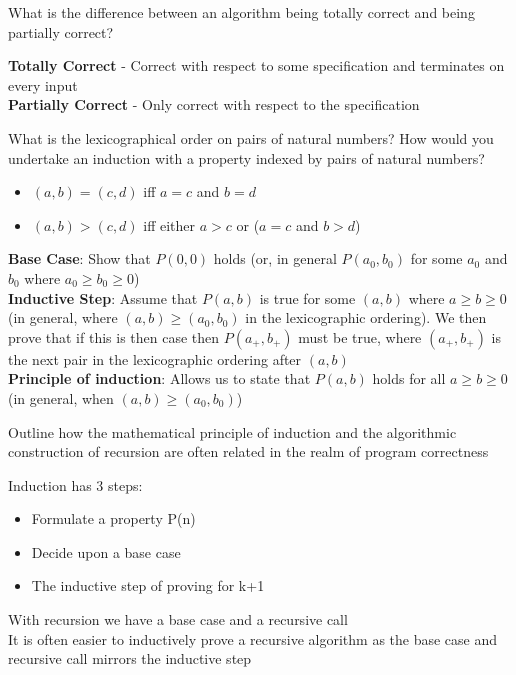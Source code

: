 \documentclass[addpoints]{exam}
\begin{document}
\begin{questions}
\question[2]What is the difference between an algorithm being totally correct and being partially correct?
\begin{solution}[2in]
\textbf{Totally Correct} - Correct with respect to some specification and terminates on every input\\
\textbf{Partially Correct} - Only correct with respect to the specification 
\end{solution}

\question[4]What is the lexicographical order on pairs of natural numbers? How would you undertake an induction with a property indexed by pairs of natural numbers?
\begin{solution}[2in]
\begin{itemize}
	\item $(a,b)=(c,d)$ iff $a=c$ and $b=d$
	\item $(a,b)>(c,d)$ iff either $a>c$ or ($a=c$ and $b>d$)
\end{itemize}
\textbf{Base Case}: Show that $P(0,0)$ holds (or, in general $P(a_0,b_0)$ for some $a_0$ and $b_0$ where $a_0\geqslant b_0\geqslant 0$)\\
\textbf{Inductive Step}: Assume that $P(a,b)$ is true for some $(a,b)$ where $a\geqslant b\geqslant 0$ (in general, where $(a,b)\geqslant(a_0,b_0)$ in the lexicographic ordering). We then prove that if this is then case then $P(a_+,b_+)$ must be true, where $(a_+,b_+)$ is the next pair in the lexicographic ordering after $(a,b)$\\
\textbf{Principle of induction}: Allows us to state that $P(a,b)$ holds for all $a\geqslant b\geqslant 0$ (in general, when $(a,b)\geqslant (a_0,b_0)$)
\end{solution}

\question[4]Outline how the mathematical principle of induction and the algorithmic construction of recursion are often related in the realm of program correctness
\begin{solution}[2in]
	Induction has 3 steps:
	\begin{itemize}
		\item Formulate a property P(n)
		\item Decide upon a base case
		\item The inductive step of proving for k+1
	\end{itemize}
	With recursion we have a base case and a recursive call\\
	It is often easier to inductively prove a recursive algorithm as the base case and recursive call mirrors the inductive step
\end{solution}


\end{questions}
\end{document}
